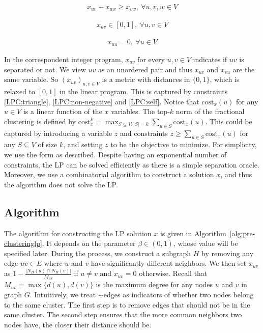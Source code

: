 \documentclass[11pt]{article}
\newcommand{\cost}{\mathrm{cost}}
\begin{document}
\begin{CJK*}{UTF8}{gbsn}
\noindent
\begin{minipage}[t]{0.4\textwidth}
    \begin{align}
        x_{uv}+x_{uw} \ge x_{vw},\  \forall u,v,w\in V \label{LPC:triangle}\end{align}
\end{minipage}\hfill
\begin{minipage}[t]{0.3\textwidth}
    \begin{align}
        x_{uv} \in [0,1],\  \forall u,v \in V \label{LPC:non-negative}
    \end{align}
\end{minipage}\hfill
\begin{minipage}[t]{0.25\textwidth}
    \begin{align}
        x_{uu} = 0, \ \forall u \in V \label{LPC:self}
    \end{align}
\end{minipage} \bigskip


In the correspondent integer program, $x_{uv}$ for every $u, v \in V$ indicates if $uv$ is separated or not. We view $uv$ as an unordered pair and thus $x_{uv}$ and $x_{vu}$ are the same variable. So $(x_{uv})_{u, v \in V}$ is a metric with distances in $\{0, 1\}$, which is relaxed to $[0, 1]$ in the linear program. This is captured by constraints \eqref{LPC:triangle}, \eqref{LPC:non-negative} and \eqref{LPC:self}.
Notice that $\cost_x(u)$ for any $u \in V$ is a linear function of the $x$ variables.  The top-$k$ norm of the fractional clustering is defined by $\cost^k_x = \max_{S \subseteq V: |S| = k} \sum_{u \in S} \cost_x(u)$. This could be captured by introducing a variable $z$ and constraints $z \geq \sum_{u \in S}\cost_x(u)$ for any $S \subseteq V$ of size $k$, and setting $z$ to be the objective to minimize. For simplicity, we use the form as described. Despite having an exponential number of constraints, the LP can be solved efficiently as there is a simple separation oracle.  Moreover, we use a combinatorial algorithm to construct a solution $x$, and thus the algorithm does not solve the LP. 

\subsection{Algorithm}
The algorithm for constructing the LP solution $x$ is given in Algorithm~\ref{alg:pre-clusteringlp}. It depends on the parameter $\beta \in (0, 1)$, whose value will be specified later. During the process, we construct a subgraph $H$ by removing any edge $uv \in E$ where $u$ and $v$ have significantly different neighbors. We then set $x_{uv}$ as $1 - \frac{|N_{H}(u) \cap N_{H}(v)|}{M_{uv}}$ if $u\neq v$ and $x_{uv} = 0$ otherwise. Recall that $M_{uv} = \max\{d(u), d(v)\}$ is the maximum degree for any nodes $u$ and $v$ in graph $G$. Intuitively, we treat $+$edges as indicators of whether two nodes belong to the same cluster. The first step is to remove edges that should not be in the same cluster. The second step ensures that the more common neighbors two nodes have, the closer their distance should be. 


\end{CJK*}
\end{document}
